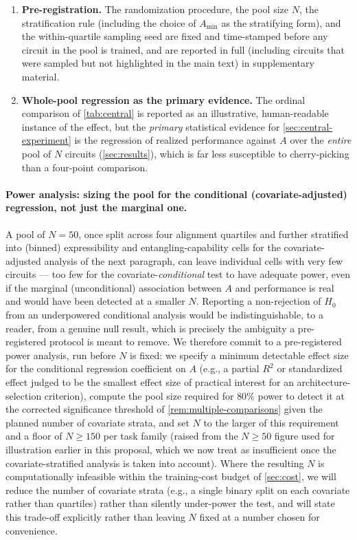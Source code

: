 \documentclass[11pt]{article}
\begin{document}
\begin{enumerate}[leftmargin=1.8em]
    \item \textbf{Pre-registration.} The randomization procedure, the pool size $N$, the stratification rule (including the choice of $A_{\min}$ as the stratifying form), and the within-quartile sampling seed are fixed and time-stamped before any circuit in the pool is trained, and are reported in full (including circuits that were sampled but not highlighted in the main text) in supplementary material.
    \item \textbf{Whole-pool regression as the primary evidence.} The ordinal comparison of \cref{tab:central} is reported as an illustrative, human-readable instance of the effect, but the \emph{primary} statistical evidence for \cref{sec:central-experiment} is the regression of realized performance against $A$ over the \emph{entire} pool of $N$ circuits (\cref{sec:results}), which is far less susceptible to cherry-picking than a four-point comparison.
\end{enumerate}

\paragraph{Power analysis: sizing the pool for the conditional (covariate-adjusted) regression, not just the marginal one.} A pool of $N=50$, once split across four alignment quartiles and further stratified into (binned) expressibility and entangling-capability cells for the covariate-adjusted analysis of the next paragraph, can leave individual cells with very few circuits --- too few for the covariate-\emph{conditional} test to have adequate power, even if the marginal (unconditional) association between $A$ and performance is real and would have been detected at a smaller $N$. Reporting a non-rejection of $H_0$ from an underpowered conditional analysis would be indistinguishable, to a reader, from a genuine null result, which is precisely the ambiguity a pre-registered protocol is meant to remove. We therefore commit to a pre-registered power analysis, run before $N$ is fixed: we specify a minimum detectable effect size for the conditional regression coefficient on $A$ (e.g., a partial $R^2$ or standardized effect judged to be the smallest effect size of practical interest for an architecture-selection criterion), compute the pool size required for $80\%$ power to detect it at the corrected significance threshold of \cref{rem:multiple-comparisons} given the planned number of covariate strata, and set $N$ to the larger of this requirement and a floor of $N \geq 150$ per task family (raised from the $N\geq 50$ figure used for illustration earlier in this proposal, which we now treat as insufficient once the covariate-stratified analysis is taken into account). Where the resulting $N$ is computationally infeasible within the training-cost budget of \cref{sec:cost}, we will reduce the number of covariate strata (e.g., a single binary split on each covariate rather than quartiles) rather than silently under-power the test, and will state this trade-off explicitly rather than leaving $N$ fixed at a number chosen for convenience.
\end{document}
